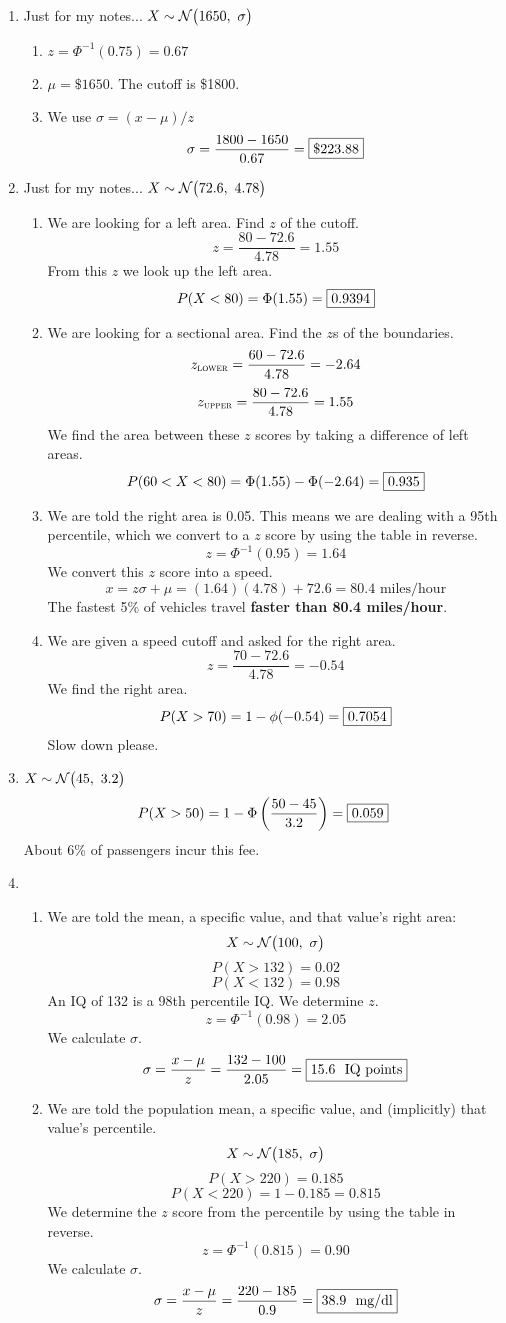 \documentclass[12pt,letterpaper]{article}
\begin{document}
\begin{enumerate}
\item Just for my notes... $X\sim \mathcal{N}\big(1650,~\sigma\big)$
\begin{enumerate}
\item $z = \Phi^{-1}(0.75) = 0.67$
\item $\mu = \$1650$. The cutoff is \$1800.
\item We use $\sigma = (x-\mu)/z$
$$\sigma = \frac{1800-1650}{0.67} = \fbox{\$223.88}$$
\end{enumerate}

\item Just for my notes... $X\sim \mathcal{N}\big(72.6,~4.78\big)$
\begin{enumerate}
\item We are looking for a left area. Find $z$ of the cutoff.
$$z = \frac{80-72.6}{4.78} = 1.55$$
From this $z$ we look up the left area.
$$P(X<80) = \Phi(1.55) = \fbox{0.9394}$$
\item We are looking for a sectional area. Find the $z$s of the boundaries.
$$z_{\textsc{lower}} = \frac{60-72.6}{4.78} = -2.64$$
$$z_{\textsc{upper}} = \frac{80-72.6}{4.78} = 1.55$$
We find the area between these $z$ scores by taking a difference of left areas.
$$P(60<X<80) = \Phi(1.55)-\Phi(-2.64) = \fbox{0.935} $$
\item We are told the right area is 0.05. This means we are dealing with a 95th percentile, which we convert to a $z$ score by using the table in reverse.
$$z = \Phi^{-1}(0.95) = 1.64 $$
We convert this $z$ score into a speed.
$$x = z\sigma+\mu = (1.64)(4.78)+72.6 = 80.4 \text{ miles/hour}$$
The fastest 5\% of vehicles travel {\bf faster than 80.4 miles/hour}.
\item We are given a speed cutoff and asked for the right area.
$$z = \frac{70-72.6}{4.78} = -0.54$$
We find the right area.
$$P(X>70) = 1-\phi(-0.54) = \fbox{0.7054} $$
 Slow down please.
\end{enumerate}

\item $X\sim \mathcal{N}\big(45,~3.2\big)$
$$P(X > 50) = 1- \Phi\left(\frac{50-45}{3.2}\right) = \fbox{0.059} $$
About 6\% of passengers incur this fee.

\item \begin{enumerate}\item We are told the mean, a specific value, and that value's right area:
$$X \sim \mathcal{N}\big(100,~\sigma\big) $$
$$P(X>132) = 0.02 $$
$$P(X<132) = 0.98 $$
An IQ of 132 is a 98th percentile IQ. We determine $z$.
$$z = \Phi^{-1}(0.98) = 2.05$$
We calculate $\sigma$.
$$\sigma = \frac{x-\mu}{z} = \frac{132-100}{2.05} = \fbox{15.6 \text{ IQ points}} $$
\item We are told the population mean, a specific value, and (implicitly) that value's percentile.
$$X\sim \mathcal{N}\big(185,~\sigma\big) $$
$$P(X > 220) = 0.185$$
$$P(X < 220) = 1-0.185 = 0.815$$
We determine the $z$ score from the percentile by using the table in reverse.
$$z = \Phi^{-1}(0.815) = 0.90 $$
We calculate $\sigma$.
$$\sigma = \frac{x-\mu}{z} = \frac{220-185}{0.9} = \fbox{38.9 \text{ mg/dl}} $$
\end{enumerate}


\end{enumerate}
\end{document}
